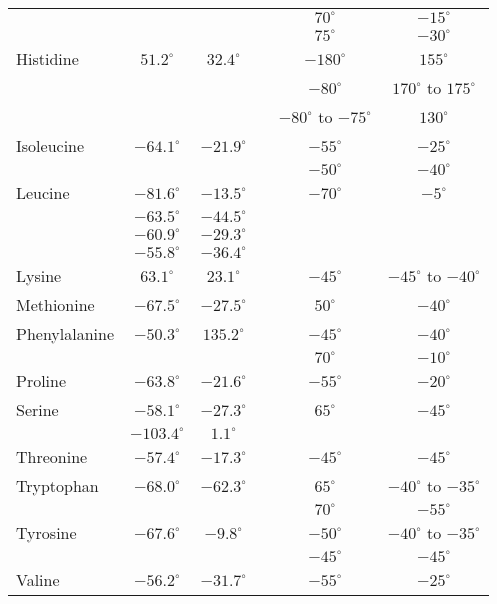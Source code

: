 \documentclass[12pt]{article}
\begin{document}
\begin{center}
\begin{tabular}{lccccc}
                 &      &       & & $70^{\circ}$ & $-15^{\circ}$\\
                 &      &       & & $75^{\circ}$ & $-30^{\circ}$\\
Histidine        & $51.2^{\circ}$ & $32.4^{\circ}$ & & $-180^{\circ}$ & $155^{\circ}$  \\
		 &	 &	& & $-80^{\circ}$ & $170^{\circ}$ to $175^{\circ}$ \\
                 &       &      & & $-80^{\circ}$ to $-75^{\circ}$ & $130^{\circ}$ \\
Isoleucine      & $-64.1^{\circ}$ & $-21.9^{\circ}$ & & $-55^{\circ}$ & $-25^{\circ}$ \\
		&	&	& & $-50^{\circ}$ & $-40^{\circ}$ \\
Leucine         & $-81.6^{\circ}$ & $-13.5^{\circ}$ & & $-70^{\circ}$ & $-5^{\circ}$  \\
                & $-63.5^{\circ}$ & $-44.5^{\circ}$ & & & \\
                & $-60.9^{\circ}$ & $-29.3^{\circ}$ & & & \\
                & $-55.8^{\circ}$ & $-36.4^{\circ}$ & & & \\     
Lysine          & $63.1^{\circ}$ & $23.1^{\circ}$ & & $-45^{\circ}$ & $-45^{\circ}$ to $-40^{\circ}$ \\
Methionine      & $-67.5^{\circ}$ & $-27.5^{\circ}$ & & $50^{\circ}$ & $-40^{\circ}$  \\
Phenylalanine   & $-50.3^{\circ}$ & $135.2^{\circ}$ & & $-45^{\circ}$ & $-40^{\circ}$  \\
                &       &       & & $70^{\circ}$ & $-10^{\circ}$ \\
Proline         &  $-63.8^{\circ}$ & $-21.6^{\circ}$ & & $-55^{\circ}$ & $-20^{\circ}$  \\
Serine          & $-58.1^{\circ}$ & $-27.3^{\circ}$ & & $65^{\circ}$ & $-45^{\circ}$ \\
		& $-103.4^{\circ}$ & $1.1^{\circ}$ & & & \\
Threonine       & $-57.4^{\circ}$ & $-17.3^{\circ}$ & & $-45^{\circ}$ & $-45^{\circ}$  \\
Tryptophan      & $-68.0^{\circ}$ & $-62.3^{\circ}$ & & $65^{\circ}$ & $-40^{\circ}$ to $-35^{\circ}$  \\
		&       &       & & $70^{\circ}$ & $-55^{\circ}$  \\
Tyrosine        & $-67.6^{\circ}$ & $-9.8^{\circ}$ & & $-50^{\circ}$ & $-40^{\circ}$ to $-35^{\circ}$ \\
                &       &       & & $-45^{\circ}$ & $-45^{\circ}$ \\
Valine          & $-56.2^{\circ}$ & $-31.7^{\circ}$ & & $-55^{\circ}$ & $-25^{\circ}$  \\
\hline
\end{tabular}
\end{center}
\end{document}
